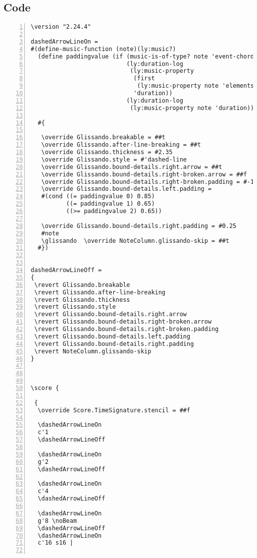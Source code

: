 \subsection{Code}
\begin{Verbatim}[numbers=left,xleftmargin=5mm]
\version "2.24.4"

dashedArrowLineOn =
#(define-music-function (note)(ly:music?)
  (define paddingvalue (if (music-is-of-type? note 'event-chord)
                           (ly:duration-log
                            (ly:music-property
                             (first
                              (ly:music-property note 'elements))
                             'duration))
                           (ly:duration-log
                            (ly:music-property note 'duration))))

  #{

   \override Glissando.breakable = ##t
   \override Glissando.after-line-breaking = ##t
   \override Glissando.thickness = #2.35
   \override Glissando.style = #'dashed-line
   \override Glissando.bound-details.right.arrow = ##t
   \override Glissando.bound-details.right-broken.arrow = ##f
   \override Glissando.bound-details.right-broken.padding = #-1
   \override Glissando.bound-details.left.padding =
   #(cond ((= paddingvalue 0) 0.85)
          ((= paddingvalue 1) 0.65)
          ((>= paddingvalue 2) 0.65))

   \override Glissando.bound-details.right.padding = #0.25
   #note
   \glissando  \override NoteColumn.glissando-skip = ##t
  #})


dashedArrowLineOff =
{
 \revert Glissando.breakable
 \revert Glissando.after-line-breaking
 \revert Glissando.thickness
 \revert Glissando.style
 \revert Glissando.bound-details.right.arrow
 \revert Glissando.bound-details.right-broken.arrow
 \revert Glissando.bound-details.right-broken.padding
 \revert Glissando.bound-details.left.padding
 \revert Glissando.bound-details.right.padding
 \revert NoteColumn.glissando-skip
}



\score {

 {
  \override Score.TimeSignature.stencil = ##f

  \dashedArrowLineOn
  c'1
  \dashedArrowLineOff

  \dashedArrowLineOn
  g'2
  \dashedArrowLineOff

  \dashedArrowLineOn
  c'4
  \dashedArrowLineOff

  \dashedArrowLineOn
  g'8 \noBeam
  \dashedArrowLineOff
  \dashedArrowLineOn
  c'16 s16 |


\end{Verbatim}

